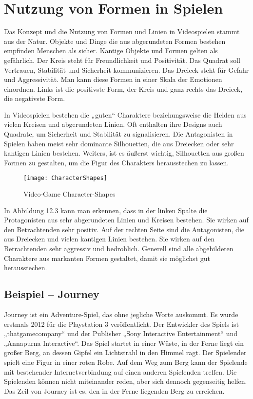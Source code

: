 \section{Nutzung von Formen in Spielen}
Das Konzept und die Nutzung von Formen und Linien in Videospielen stammt aus der Natur. Objekte und Dinge die aus abgerundeten Formen bestehen empfinden Menschen als sicher. Kantige Objekte und Formen gelten als gefährlich. Der Kreis steht für Freundlichkeit und Positivität. Das Quadrat soll Vertrauen, Stabilität und Sicherheit kommunizieren. Das Dreieck steht für Gefahr und Aggressivität. Man kann diese Formen in einer Skala der Emotionen einordnen. Links ist die positivste Form, der Kreis und ganz rechts das Dreieck, die negativste Form. 
\cite{_drawing_basics_and_video_game_art}

In Videospielen bestehen die „guten“ Charaktere beziehungsweise die Helden aus vielen Kreisen und abgerundeten Linien. Oft enthalten ihre Designs auch Quadrate, um Sicherheit und Stabilität zu signalisieren. Die Antagonisten in Spielen haben meist sehr dominante Silhouetten, die aus Dreiecken oder sehr kantigen Linien bestehen. Weiters, ist es äußerst wichtig, Silhouetten aus großen Formen zu gestalten, um die Figur des Charakters herausstechen zu lassen.
\cite{_drawing_basics_and_video_game_art}

\begin{figure}[H]
	\centering
	\texttt{[image: CharacterShapes]}
	\caption{Video-Game Character-Shapes\cite{_drawing_basics_and_video_game_art}}
\end{figure}

In Abbildung 12.3 kann man erkennen, dass in der linken Spalte die Protagonisten aus sehr abgerundeten Linien und Kreisen bestehen. Sie wirken auf den Betrachtenden sehr positiv. Auf der rechten Seite sind die Antagonisten, die aus Dreiecken und vielen kantigen Linien bestehen. Sie wirken auf den Betrachtenden sehr aggressiv und bedrohlich. Generell sind alle abgebildeten Charaktere aus markanten Formen gestaltet, damit sie möglichst gut herausstechen. 
\cite{_drawing_basics_and_video_game_art}

\subsection{Beispiel – Journey}
Journey ist ein Adventure-Spiel, das ohne jegliche Worte auskommt. Es wurde erstmals 2012 für die Playstation 3 veröffentlicht. Der Entwickler des Spiels ist „thatgamecompany“ und der Publisher „Sony Interactive Entertainment“ und „Annapurna Interactive“. Das Spiel startet in einer Wüste, in der Ferne liegt ein großer Berg, an dessen Gipfel ein Lichtstrahl in den Himmel ragt. Der Spielender spielt eine Figur in einer roten Robe. Auf dem Weg zum Berg kann der Spielende mit bestehender Internetverbindung auf einen anderen Spielenden treffen. Die Spielenden können nicht miteinander reden, aber sich dennoch gegenseitig helfen. Das Zeil von Journey ist es, den in der Ferne liegenden Berg zu erreichen.
\cite{_drawing_basics_and_video_game_art}

